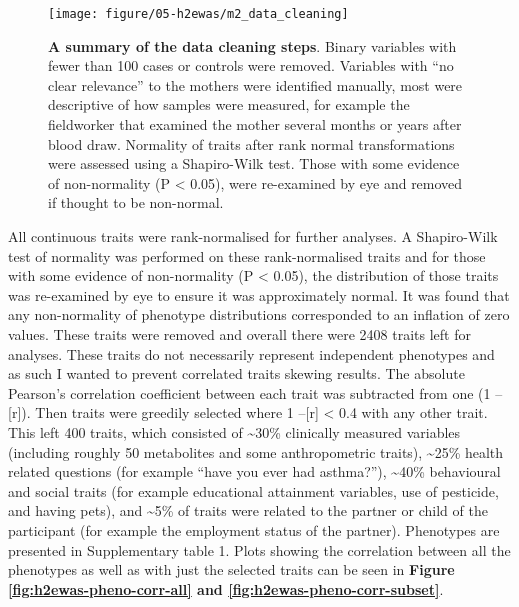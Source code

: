 \documentclass[11pt,oneside]{bristolthesis}
\begin{document}
\begin{figure}

{\centering \texttt{[image: figure/05-h2ewas/m2\_data\_cleaning]} 

}

\caption[A summary of the data cleaning steps]{\textbf{A summary of the data cleaning steps}. Binary variables with fewer than 100 cases or controls were removed. Variables with ``no clear relevance'' to the mothers were identified manually, most were descriptive of how samples were measured, for example the fieldworker that examined the mother several months or years after blood draw. Normality of traits after rank normal transformations were assessed using a Shapiro-Wilk test. Those with some evidence of non-normality (P \textless{} 0.05), were re-examined by eye and removed if thought to be non-normal.}\label{fig:h2ewas-pheno-qc}
\end{figure}
All continuous traits were rank-normalised for further analyses. A Shapiro-Wilk test of normality was performed on these rank-normalised traits and for those with some evidence of non-normality (P \textless{} 0.05), the distribution of those traits was re-examined by eye to ensure it was approximately normal. It was found that any non-normality of phenotype distributions corresponded to an inflation of zero values. These traits were removed and overall there were 2408 traits left for analyses. These traits do not necessarily represent independent phenotypes and as such I wanted to prevent correlated traits skewing results. The absolute Pearson's correlation coefficient between each trait was subtracted from one (1 --{[}r{]}). Then traits were greedily selected where 1 --{[}r{]} \textless{} 0.4 with any other trait. This left 400 traits, which consisted of \textasciitilde30\% clinically measured variables (including roughly 50 metabolites and some anthropometric traits), \textasciitilde25\% health related questions (for example ``have you ever had asthma?''), \textasciitilde40\% behavioural and social traits (for example educational attainment variables, use of pesticide, and having pets), and \textasciitilde5\% of traits were related to the partner or child of the participant (for example the employment status of the partner). Phenotypes are presented in Supplementary table 1. Plots showing the correlation between all the phenotypes as well as with just the selected traits can be seen in \textbf{Figure \ref{fig:h2ewas-pheno-corr-all} and \ref{fig:h2ewas-pheno-corr-subset}}.
\end{document}
